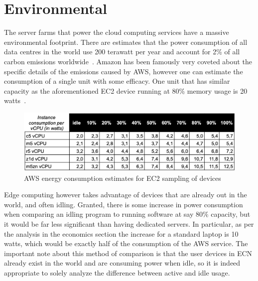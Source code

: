 \documentclass[../mthe-493-final-project.tex]{subfiles}
\begin{document}
    \section{Environmental}
    \label{sec:environmental}
    The server farms that power the cloud computing services have a massive environmental footprint. There are estimates that the power consumption of all data centres in the world use 200 terawatt per year and account for 2\% of all carbon emissions worldwide~\cite{edge-computing-sustainability}. Amazon has been famously very coveted about the specific details of the emissions caused by AWS, however one can estimate the consumption of a single unit with some efficacy. One unit that has similar capacity as the aforementioned EC2 device running at 80\% memory usage is 20 watts~\cite{ec2-energy-estimation}. 
    \begin{figure}
        \centering
        \includegraphics{thesis/img/ec2-energy-consumption.png}
        \caption{AWS energy consumption estimates for EC2 sampling of devices}
        \label{fig:ec2-energy-fig}
    \end{figure}
    Edge computing however takes advantage of devices that are already out in the world, and often idling. Granted, there is some increase in power consumption when comparing an idling program to running software at say 80\% capacity, but it would be far less significant than having dedicated servers. In particular, as per the analysis in the economics section the increase for a standard laptop is 10 watts, which would be exactly half of the consumption of the AWS service. The important note about this method of comparison is that the user devices in ECN already exist in the world and are consuming power when idle, so it is indeed appropriate to solely analyze the difference between active and idle usage. 

    
\end{document}

